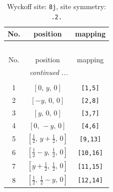 \documentclass[fleqn,8pt]{jsarticle}
\begin{document}
\begin{longtable}{ccc}
\caption{Wyckoff site: {\tt 8j}, site symmetry: {\tt .2.}}
 \\
 \hline \hline
No. & position & mapping \\ \hline \endfirsthead

\multicolumn{2}{l}{\tablename\ \thetable{}} \\
 \hline \hline
No. & position & mapping \\ \hline \endhead

 \hline \hline
\multicolumn{2}{r}{\footnotesize\it continued ...} \\ \endfoot

 \hline \hline
\multicolumn{2}{r}{} \\ \endlastfoot

1 & $\left[ 0,\, y,\, 0 \right]$ & {\tt [1,5]} \\ \hline
2 & $\left[ - y,\, 0,\, 0 \right]$ & {\tt [2,8]} \\ \hline
3 & $\left[ y,\, 0,\, 0 \right]$ & {\tt [3,7]} \\ \hline
4 & $\left[ 0,\, - y,\, 0 \right]$ & {\tt [4,6]} \\ \hline
5 & $\left[ \frac{1}{2},\, y + \frac{1}{2},\, 0 \right]$ & {\tt [9,13]} \\ \hline
6 & $\left[ \frac{1}{2} - y,\, \frac{1}{2},\, 0 \right]$ & {\tt [10,16]} \\ \hline
7 & $\left[ y + \frac{1}{2},\, \frac{1}{2},\, 0 \right]$ & {\tt [11,15]} \\ \hline
8 & $\left[ \frac{1}{2},\, \frac{1}{2} - y,\, 0 \right]$ & {\tt [12,14]} \\
\end{longtable}
\renewcommand{\arraystretch}{1.2}
\end{document}
